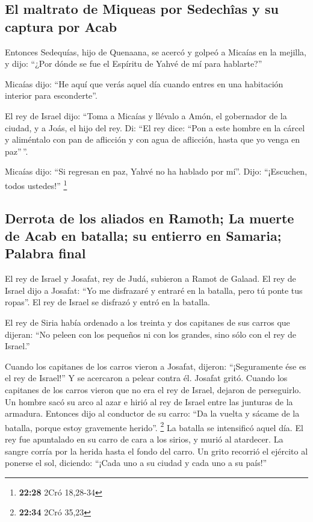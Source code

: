\hypertarget{el-maltrato-de-miqueas-por-sedechuxeeas-y-su-captura-por-acab}{%
\subsection{El maltrato de Miqueas por Sedechîas y su captura por
Acab}\label{el-maltrato-de-miqueas-por-sedechuxeeas-y-su-captura-por-acab}}

 Entonces Sedequías, hijo de Quenaana, se acercó y golpeó
a Micaías en la mejilla, y dijo: ``¿Por dónde se fue el Espíritu de
Yahvé de mí para hablarte?''

 Micaías dijo: ``He aquí que verás aquel día cuando
entres en una habitación interior para esconderte''.

 El rey de Israel dijo: ``Toma a Micaías y llévalo a
Amón, el gobernador de la ciudad, y a Joás, el hijo del rey.
 Di: ``El rey dice: ``Pon a este hombre en la cárcel y
aliméntalo con pan de aflicción y con agua de aflicción, hasta que yo
venga en paz''\,''.

 Micaías dijo: ``Si regresan en paz, Yahvé no ha hablado
por mí''. Dijo: ``¡Escuchen, todos ustedes!'' \footnote{\textbf{22:28}
  2Cró 18,28-34}

\hypertarget{derrota-de-los-aliados-en-ramoth-la-muerte-de-acab-en-batalla-su-entierro-en-samaria-palabra-final}{%
\subsection{Derrota de los aliados en Ramoth; La muerte de Acab en
batalla; su entierro en Samaria; Palabra
final}\label{derrota-de-los-aliados-en-ramoth-la-muerte-de-acab-en-batalla-su-entierro-en-samaria-palabra-final}}

 El rey de Israel y Josafat, rey de Judá, subieron a
Ramot de Galaad.  El rey de Israel dijo a Josafat: ``Yo
me disfrazaré y entraré en la batalla, pero tú ponte tus ropas''. El rey
de Israel se disfrazó y entró en la batalla.

 El rey de Siria había ordenado a los treinta y dos
capitanes de sus carros que dijeran: ``No peleen con los pequeños ni con
los grandes, sino sólo con el rey de Israel.''

 Cuando los capitanes de los carros vieron a Josafat,
dijeron: ``¡Seguramente ése es el rey de Israel!'' Y se acercaron a
pelear contra él. Josafat gritó.  Cuando los capitanes de
los carros vieron que no era el rey de Israel, dejaron de perseguirlo.
 Un hombre sacó su arco al azar e hirió al rey de Israel
entre las junturas de la armadura. Entonces dijo al conductor de su
carro: ``Da la vuelta y sácame de la batalla, porque estoy gravemente
herido''. \footnote{\textbf{22:34} 2Cró 35,23}  La
batalla se intensificó aquel día. El rey fue apuntalado en su carro de
cara a los sirios, y murió al atardecer. La sangre corría por la herida
hasta el fondo del carro.  Un grito recorrió el ejército
al ponerse el sol, diciendo: ``¡Cada uno a su ciudad y cada uno a su
país!''

